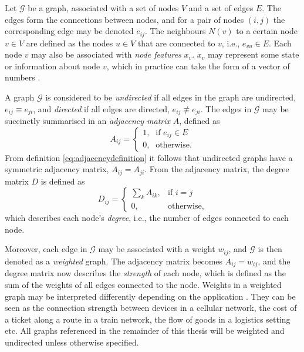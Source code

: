 Let $\mathcal{G}$ be a graph, associated with a set of nodes $V$ and a set of edges $E$. The edges form the connections between nodes, and for a pair of nodes $(i,j)$ the corresponding edge may be denoted $e_{ij}$. The neighbours $N(v)$ to a certain node $v \in V$ are defined as the nodes $u \in V$ that are connected to $v$, i.e., $e_{vu} \in E$. Each node $v$ may also be associated with \textit{node features} $x_v$. $x_v$ may represent some state or information about node $v$, which in practice can take the form of a vector of numbers \cite{active_learning_node_classification}.

A graph $\mathcal{G}$ is considered to be \textit{undirected} if all edges in the graph are undirected, $e_{ij} \equiv e_{ji}$, and \textit{directed} if all edges are directed, $e_{ij} \not\equiv e_{ji}$. The edges in $\mathcal{G}$ may be succinctly summarised in an \textit{adjacency matrix} $A$, defined as
\begin{equation}
    A_{ij} = \begin{cases} \mbox{1,} & \mbox{if } e_{ij} \in E \\ \mbox{0,} & \mbox{otherwise.} \end{cases}
    \label{eq:adjacencydefinition}
\end{equation}
From definition \eqref{eq:adjacencydefinition} it follows that undirected graphs have a symmetric adjacency matrix, $A_{ij} = A_{ji}$. From the adjacency matrix, the degree matrix $D$ is defined as
\begin{equation}
    D_{ij} = \begin{cases} \sum_k A_{ik}, & \mbox{if } i = j \\ \mbox{0,} & \mbox{otherwise,} \end{cases}
    \label{eq:degreematrixdefinition}
\end{equation}
which describes each node's \textit{degree}, i.e., the number of edges connected to each node.

Moreover, each edge in $\mathcal{G}$ may be associated with a weight $w_{ij}$, and $\mathcal{G}$ is then denoted as a \textit{weighted} graph. The adjacency matrix becomes $A_{ij} = w_{ij}$, and the degree matrix now describes the \textit{strength} of each node, which is defined as the sum of the weights of all edges connected to the node. Weights in a weighted graph may be interpreted differently depending on the application \cite{adventures_in_graph_theory_chap1}. They can be seen as the connection strength between devices in a cellular network, the cost of a ticket along a route in a train network, the flow of goods in a logistics setting etc. All graphs referenced in the remainder of this thesis will be weighted and undirected unless otherwise specified.

